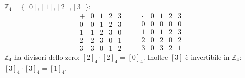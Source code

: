 \documentclass[11pt,a4paper]{article}
\begin{document}
$\mathbb{Z}_4 = \{[0], [1], [2], [3]\}$:
\[
\begin{array}{c|cccc} + & 0 & 1 & 2 & 3 \\ \hline 0 & 0 & 1 & 2 & 3 \\ 1 & 1 & 2 & 3 & 0 \\ 2 & 2 & 3 & 0 & 1 \\ 3 & 3 & 0 & 1 & 2 \end{array}
\qquad
\begin{array}{c|cccc} \cdot & 0 & 1 & 2 & 3 \\ \hline 0 & 0 & 0 & 0 & 0 \\ 1 & 0 & 1 & 2 & 3 \\ 2 & 0 & 2 & 0 & 2 \\ 3 & 0 & 3 & 2 & 1 \end{array}
\]
$\mathbb{Z}_4$ ha divisori dello zero: $[2]_4\cdot[2]_4 = [0]_4$. Inoltre $[3]$ è invertibile in $\mathbb{Z}_4$: $[3]_4\cdot[3]_4 = [1]_4$.
\end{document}

